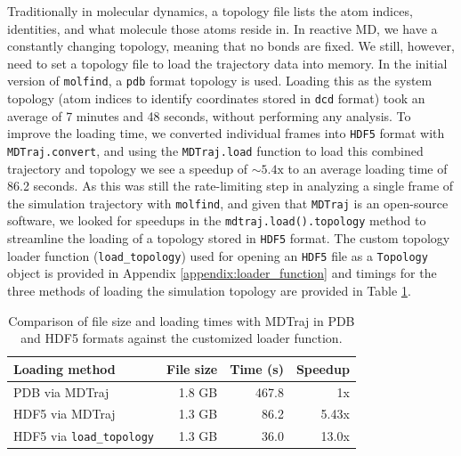 Traditionally in molecular dynamics, a topology file lists the atom indices, identities, and what molecule those atoms reside in.
In reactive MD, we have a constantly changing topology, meaning that no bonds are fixed.
We still, however, need to set a topology file to load the trajectory data into memory.
In the initial version of \verb|molfind|, a \verb|pdb| format topology is used. 
Loading this as the system topology (atom indices to identify coordinates stored in \verb|dcd| format) took an average of 7 minutes and 48 seconds, without performing any analysis.
To improve the loading time, we converted individual frames into \verb|HDF5| format with \verb|MDTraj.convert|, and using the \verb|MDTraj.load| function to load this combined trajectory and topology we see a speedup of $\sim5.4\text{x}$ to an average loading time of 86.2 seconds.
As this was still the rate-limiting step in analyzing a single frame of the simulation trajectory with \verb|molfind|, and given that \verb|MDTraj| is an open-source software, we looked for speedups in the \verb|mdtraj.load().topology| method to streamline the loading of a topology stored in \verb|HDF5| format.
The custom topology loader function (\verb|load_topology|) used for opening an \verb|HDF5| file as a \verb|Topology| object is provided in Appendix \ref{appendix:loader_function} and timings for the three methods of loading the simulation topology are provided in Table \ref{tbl:top_loader_timings}.

\begin{table}[h!]
\centering
\caption[Hero Run topology loading times]{Comparison of file size and loading times with MDTraj in PDB and HDF5 formats against the customized loader function.
}\label{tbl:top_loader_timings}
\begin{tabularx}{0.63\textwidth}{lrrr}  
\toprule
Loading method & File size & Time (s) & Speedup \\
\midrule
PDB via MDTraj & 1.8 GB & 467.8 & 1x \\
HDF5 via MDTraj & 1.3 GB & 86.2 & 5.43x \\
HDF5 via \verb|load_topology| & 1.3 GB & 36.0 & 13.0x \\
\bottomrule
\end{tabularx}
\end{table}

